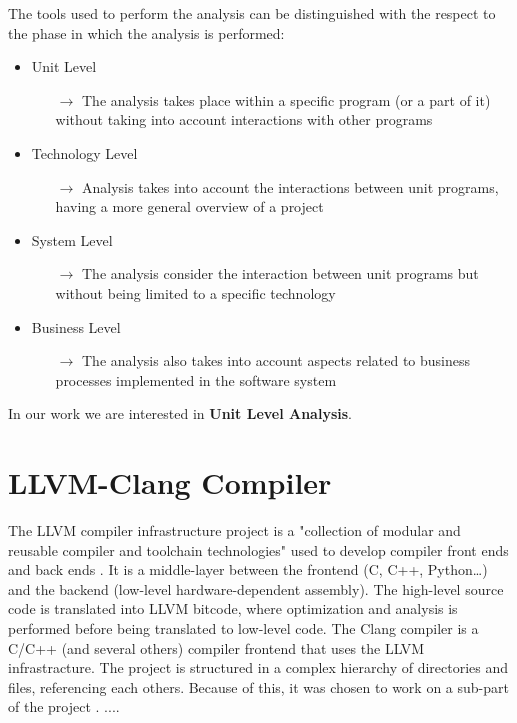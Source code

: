 The tools used to perform the analysis can be distinguished with the respect to the phase in which the analysis is performed:

\begin{itemize}
	\item Unit Level
	\begin{itemize}
		\item[$\rightarrow$] The analysis takes place within a specific program (or a part of it) without taking into account interactions with other programs
	\end{itemize}
	\item Technology Level
	\begin{itemize}
		\item[$\rightarrow$] Analysis takes into account the interactions between unit programs, having a more general overview of a project
	\end{itemize}
	\item System Level
	\begin{itemize}
		\item[$\rightarrow$] The analysis consider the interaction between unit programs but without being limited to a specific technology
	\end{itemize}
	\item Business Level
	\begin{itemize}
		\item[$\rightarrow$] The analysis also takes into account aspects related to business processes implemented in the software system
	\end{itemize}
\end{itemize}

In our work we are interested in \textbf{Unit Level Analysis}.
\pagebreak

\section{LLVM-Clang Compiler}

The LLVM compiler infrastructure project is a "collection of modular and reusable compiler and toolchain technologies" used to develop compiler front ends and back ends \cite{bibitem1}. It is a middle-layer between the frontend (C, C++, Python\dots) and the backend (low-level hardware-dependent assembly). The high-level source code is translated into LLVM bitcode, where optimization and analysis is performed before being translated to low-level code.\newline\newline
The Clang compiler is a C/C++ (and several others) compiler frontend that uses the LLVM infrastracture.\newline
The project is structured in a complex hierarchy of directories and files, referencing each others. Because of this, it was chosen to work on a sub-part of the project . ....